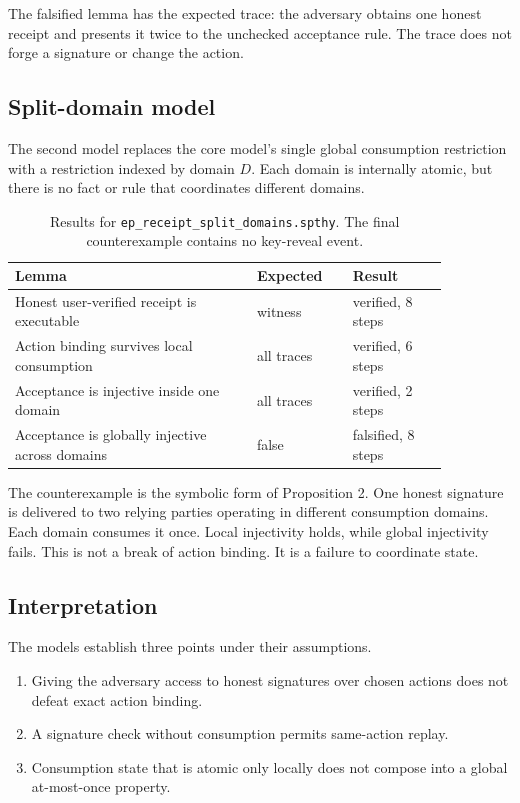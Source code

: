 \documentclass[10.5pt]{article}
\newcommand{\code}[1]{\texttt{#1}}
\begin{document}
The falsified lemma has the expected trace: the adversary obtains one honest
receipt and presents it twice to the unchecked acceptance rule. The trace does not
forge a signature or change the action.

\subsection{Split-domain model}

The second model replaces the core model's single global consumption restriction
with a restriction indexed by domain $D$. Each domain is internally atomic, but
there is no fact or rule that coordinates different domains.

\begin{table}[h]
\centering
\small
\begin{tabular}{p{0.48\linewidth}p{0.19\linewidth}p{0.19\linewidth}}
\toprule
Lemma & Expected & Result \\
\midrule
Honest user-verified receipt is executable & witness & verified, 8 steps \\
Action binding survives local consumption & all traces & verified, 6 steps \\
Acceptance is injective inside one domain & all traces & verified, 2 steps \\
Acceptance is globally injective across domains & false & falsified, 8 steps \\
\bottomrule
\end{tabular}
\caption{Results for \code{ep\_receipt\_split\_domains.spthy}. The final
counterexample contains no key-reveal event.}
\end{table}

The counterexample is the symbolic form of Proposition 2. One honest signature is
delivered to two relying parties operating in different consumption domains.
Each domain consumes it once. Local injectivity holds, while global injectivity
fails. This is not a break of action binding. It is a failure to coordinate
state.

\subsection{Interpretation}

The models establish three points under their assumptions.

\begin{enumerate}[leftmargin=*]
\item Giving the adversary access to honest signatures over chosen actions does
not defeat exact action binding.
\item A signature check without consumption permits same-action replay.
\item Consumption state that is atomic only locally does not compose into a
global at-most-once property.
\end{enumerate}
\end{document}
